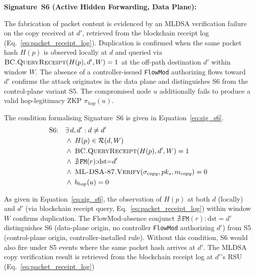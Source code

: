 \documentclass[12pt, a4paper]{report}
\begin{document}

\textbf{Signature~S6 (Active Hidden Forwarding, Data Plane):}

The fabrication of packet content is evidenced by an
\ac{MLDSA} verification failure on the copy received
at $d'$, retrieved from the blockchain receipt log
(Eq.~\ref{eq:packet_receipt_log}). Duplication is
confirmed when the same packet hash $H(p)$ is
observed locally at $d$ and queried via
$\textsc{BC.QueryReceipt}(H(p),d',W)=1$ at the
off-path destination $d'$ within window $W$.
The absence of a controller-issued \texttt{FlowMod}
authorizing flows toward $d'$ confirms the attack
originates in the data plane and distinguishes S6
from the control-plane variant S5. The compromised
node $u$ additionally fails to produce a valid
hop-legitimacy \ac{ZKP} $\pi_{hop}(u)$.

The condition formalising Signature~S6 is given in
Equation~\eqref{eq:sig_s6}.
\begin{equation}
\begin{aligned}
\text{S6:}\quad
  & \exists\, d, d' : d \neq d' \\
  & \wedge\; H(p) \in \mathcal{R}(d, W) \\
  & \wedge\; \textsc{BC.QueryReceipt}(H(p), d', W)
    = 1 \\
  & \wedge\; \nexists\,\texttt{FM}(r){:}
    \text{dst}{=}d' \\
  & \wedge\; \textsc{ML-DSA-87.Verify}(
    \sigma_{copy}, pk_s, m_{copy}) = 0 \\
  & \wedge\; b_{hop}(u) = 0
\end{aligned}
\label{eq:sig_s6}
\end{equation}

As given in Equation~\eqref{eq:sig_s6}, the
observation of $H(p)$ at both $d$ (locally) and $d'$
(via blockchain receipt query,
Eq.~\ref{eq:packet_receipt_log}) within window $W$
confirms duplication. The \ac{FlowMod}-absence
conjunct $\nexists\,\texttt{FM}(r){:}\text{dst}{=}d'$
distinguishes S6 (data-plane origin, no controller
\texttt{FlowMod} authorizing $d'$) from S5
(control-plane origin, controller-installed rule).
Without this condition, S6 would also fire under S5
events where the same packet hash arrives at $d'$.
The \ac{MLDSA} copy verification result is retrieved
from the blockchain receipt log at $d'$'s \ac{RSU}
(Eq.~\ref{eq:packet_receipt_log})



\end{document}
